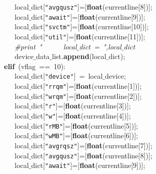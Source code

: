\mbox{}\ \ \ \ \ \ \ \ \ \ \ \ \ \ \ \ \ \ \ \ \ local$\_$dict[\texttt{"{}avgqusz"{}}]=[\textbf{float}(currentline[8])]; \\
\mbox{}\ \ \ \ \ \ \ \ \ \ \ \ \ \ \ \ \ \ \ \ \ local$\_$dict[\texttt{"{}await"{}}]=[\textbf{float}(currentline[9])]; \\
\mbox{}\ \ \ \ \ \ \ \ \ \ \ \ \ \ \ \ \ \ \ \ \ local$\_$dict[\texttt{"{}svctm"{}}]=[\textbf{float}(currentline[10])]; \\
\mbox{}\ \ \ \ \ \ \ \ \ \ \ \ \ \ \ \ \ \ \ \ \ local$\_$dict[\texttt{"{}util"{}}]=[\textbf{float}(currentline[11])]; \\
\mbox{}\ \ \ \ \ \ \ \ \ \ \ \ \ \ \ \ \ \ \ \ \ \textit{\#print\ "{}\ \ \ \ \ \ local$\_$dict\ =\ "{},local$\_$dict} \\
\mbox{}\ \ \ \ \ \ \ \ \ \ \ \ \ \ \ \ \ \ \ \ \ device$\_$data$\_$list.\textbf{append}(local$\_$dict); \\
\mbox{}\ \ \ \ \ \ \ \ \ \ \ \ \ \ \ \ \ \ \textbf{elif}\ (vflag\ ==\ 10): \\
\mbox{}\ \ \ \ \ \ \ \ \ \ \ \ \ \ \ \ \ \ \ \ \ local$\_$dict[\texttt{"{}device"{}}]\ =\ local$\_$device; \\
\mbox{}\ \ \ \ \ \ \ \ \ \ \ \ \ \ \ \ \ \ \ \ \ local$\_$dict[\texttt{"{}rrqm"{}}]=[\textbf{float}(currentline[1])]; \\
\mbox{}\ \ \ \ \ \ \ \ \ \ \ \ \ \ \ \ \ \ \ \ \ local$\_$dict[\texttt{"{}wrqm"{}}]=[\textbf{float}(currentline[2])]; \\
\mbox{}\ \ \ \ \ \ \ \ \ \ \ \ \ \ \ \ \ \ \ \ \ local$\_$dict[\texttt{"{}r"{}}]=[\textbf{float}(currentline[3])];\  \\
\mbox{}\ \ \ \ \ \ \ \ \ \ \ \ \ \ \ \ \ \ \ \ \ local$\_$dict[\texttt{"{}w"{}}]=[\textbf{float}(currentline[4])]; \\
\mbox{}\ \ \ \ \ \ \ \ \ \ \ \ \ \ \ \ \ \ \ \ \ local$\_$dict[\texttt{"{}rMB"{}}]=[\textbf{float}(currentline[5])]; \\
\mbox{}\ \ \ \ \ \ \ \ \ \ \ \ \ \ \ \ \ \ \ \ \ local$\_$dict[\texttt{"{}wMB"{}}]=[\textbf{float}(currentline[6])]; \\
\mbox{}\ \ \ \ \ \ \ \ \ \ \ \ \ \ \ \ \ \ \ \ \ local$\_$dict[\texttt{"{}avgrqsz"{}}]=[\textbf{float}(currentline[7])]; \\
\mbox{}\ \ \ \ \ \ \ \ \ \ \ \ \ \ \ \ \ \ \ \ \ local$\_$dict[\texttt{"{}avgqusz"{}}]=[\textbf{float}(currentline[8])]; \\
\mbox{}\ \ \ \ \ \ \ \ \ \ \ \ \ \ \ \ \ \ \ \ \ local$\_$dict[\texttt{"{}await"{}}]=[\textbf{float}(currentline[9])]; \\
